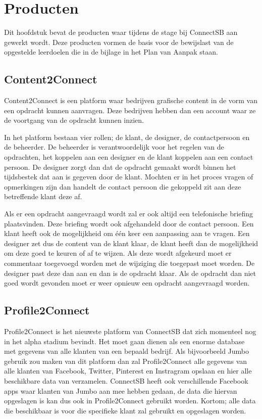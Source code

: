 \section{Producten}
Dit hoofdstuk bevat de producten waar tijdens de stage bij ConnectSB aan gewerkt wordt. Deze producten vormen de basis voor de bewijslast van de opgestelde leerdoelen die in de bijlage in het Plan van Aanpak staan.

\subsection{Content2Connect}
Content2Connect is een platform waar bedrijven grafische content in de vorm van een opdracht kunnen aanvragen. Deze bedrijven hebben dan een account waar ze de voortgang van de opdracht kunnen inzien.

In het platform bestaan vier rollen; de klant, de designer, de contactpersoon en de beheerder. De beheerder is verantwoordelijk voor het regelen van de opdrachten, het koppelen aan een designer en de klant koppelen aan een contact persoon. De designer zorgt dan dat de opdracht gemaakt wordt binnen het tijdsbestek dat aan is gegeven door de klant. Mochten er in het proces vragen of opmerkingen zijn dan handelt de contact persoon die gekoppeld zit aan deze betreffende klant deze af.

Als er een opdracht aangevraagd wordt zal er ook altijd een telefonische briefing plaatsvinden. Deze briefing wordt ook afgehandeld door de contact persoon. Een klant heeft ook de mogelijkheid om één keer een aanpassing aan te vragen. Een designer zet dus de content van de klant klaar, de klant heeft dan de mogelijkheid om deze goed te keuren of af te wijzen. Als deze wordt afgekeurd moet er commentaar toegevoegd worden met de wijziging die toegepast moet worden. De designer past deze dan aan en dan is de opdracht klaar. Als de opdracht dan niet goed wordt gevonden moet er weer opnieuw een opdracht aangevraagd worden.

\subsection{Profile2Connect}
Profile2Connect is het nieuwste platform van ConnectSB dat zich momenteel nog in het alpha stadium bevindt. Het moet gaan dienen als een enorme database met gegevens van alle klanten van een bepaald bedrijf. Als bijvoorbeeld Jumbo gebruik zou maken van dit platform dan zal Profile2Connect alle gegevens van alle klanten van Facebook, Twitter, Pinterest en Instragram opslaan en hier alle beschikbare data van verzamelen. ConnectSB heeft ook verschillende Facebook apps waar klanten van Jumbo aan mee hebben gedaan, de data die hiervan opgeslagen is kan dus ook in Profile2Connect gebruikt worden. Kortom; alle data die beschikbaar is voor die specifieke klant zal gebruikt en opgeslagen worden.


